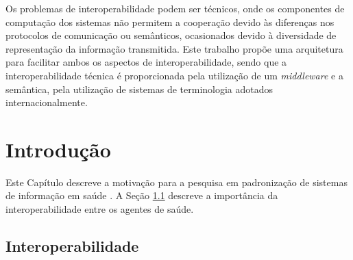 \documentclass[a4paper, 12pt, ruledheader,pnumplain,normalfigtabnum]{abnt}
\begin{document}

 \data{\today}

\capa 

\folhaderosto

\pagestyle{headings}

\setcounter{page}{1}

\sumario

\begin{resumo}
  Os problemas de interoperabilidade podem ser técnicos, onde os
  componentes de computação dos sistemas não permitem a cooperação
  devido às diferenças nos protocolos de comunicação ou semânticos,
  ocasionados devido à diversidade de representação da informação
  transmitida. Este trabalho propõe uma arquitetura para facilitar
  ambos os aspectos de interoperabilidade, sendo que a
  interoperabilidade técnica é proporcionada pela utilização de um
  {\em middleware} e a semântica, pela utilização de sistemas de
  terminologia adotados internacionalmente.
\end{resumo}

\clearpage

\pagestyle{ruledheader}
\setcounter{page}{1}

\chapter{Introdução}
\label{introducao}

Este Capítulo descreve a motivação para a pesquisa em padronização de
sistemas de informação em saúde . A Seção \ref{intro:interoperability}
descreve a importância da interoperabilidade entre os agentes de
saúde.  

\section{Interoperabilidade}
\label{intro:interoperability}
\end{document}
